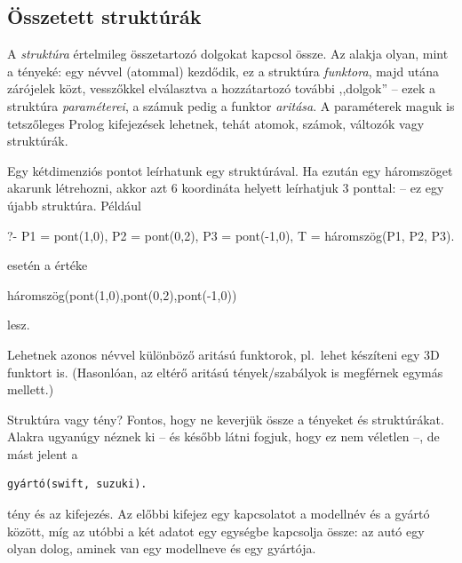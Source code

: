 \subsection*{Összetett struktúrák}
A \emph{struktúra} értelmileg összetartozó dolgokat
kapcsol össze. Az alakja olyan, mint a tényeké: egy
névvel (atommal) kezdődik, ez a struktúra
\emph{funktora}, majd utána zárójelek közt,
vesszőkkel elválasztva a hozzátartozó további
,,dolgok'' -- ezek a struktúra \emph{paraméterei}, a
számuk pedig a funktor \emph{aritása}.
A paraméterek maguk is tetszőleges Prolog
kifejezések lehetnek, tehát atomok, számok, változók
vagy struktúrák.

Egy kétdimenziós pontot leírhatunk egy
 struktúrával. Ha ezután egy
háromszöget akarunk létrehozni, akkor azt 6
koordináta helyett leírhatjuk 3 ponttal:
 -- ez egy újabb
struktúra. Például
\begin{query}
?- P1 = pont(1,0), P2 = pont(0,2), P3 = pont(-1,0),
   T = háromszög(P1, P2, P3).
\end{query}
esetén a  értéke
\begin{query}
háromszög(pont(1,0),pont(0,2),pont(-1,0))
\end{query}
lesz.

Lehetnek azonos névvel különböző aritású funktorok,
pl.~lehet készíteni egy 3D  funktort
is. (Hasonlóan, az eltérő aritású tények/szabályok is
megférnek egymás mellett.)

\begin{infobox*}{}{Struktúra vagy tény?}
Fontos, hogy ne keverjük össze a tényeket és
struktúrákat. Alakra ugyanúgy néznek ki -- és
később látni fogjuk, hogy ez nem véletlen --, de
mást jelent a
\begin{verbatim}
gyártó(swift, suzuki).
\end{verbatim}
tény és az  kifejezés. Az
előbbi kifejez egy kapcsolatot a modellnév és a
gyártó között, míg az utóbbi a két adatot egy
egységbe kapcsolja össze: az autó egy olyan dolog,
aminek van egy modellneve és egy gyártója.
\end{infobox*}

